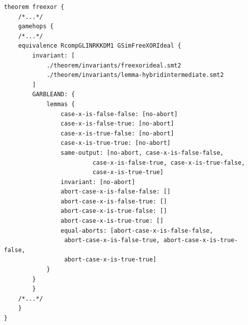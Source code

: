 \begin{longlisting}
\begin{verbatim}
theorem freexor {
    /*...*/
    gamehops {
    /*...*/
    equivalence RcompGLINRKKDM1 GSimFreeXORIdeal {
        invariant: [
            ./theorem/invariants/freexorideal.smt2
            ./theorem/invariants/lemma-hybridintermediate.smt2
        ]
        GARBLEAND: {
            lemmas {
                case-x-is-false-false: [no-abort]
                case-x-is-false-true: [no-abort]
                case-x-is-true-false: [no-abort]
                case-x-is-true-true: [no-abort]
                same-output: [no-abort, case-x-is-false-false,
                         case-x-is-false-true, case-x-is-true-false,
                         case-x-is-true-true]
                invariant: [no-abort]
                abort-case-x-is-false-false: []
                abort-case-x-is-false-true: []
                abort-case-x-is-true-false: []
                abort-case-x-is-true-true: []
                equal-aborts: [abort-case-x-is-false-false,
                 abort-case-x-is-false-true, abort-case-x-is-true-false,
                 abort-case-x-is-true-true]
            }
        }
        }
    /*...*/
    }
}
\end{verbatim}
\caption{Game hop 9 in the  theorem}
\label{lst:domino-freexor-gamehop8}
\end{longlisting}